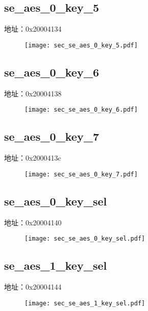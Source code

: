 \subsection{se\_aes\_0\_key\_5}
\label{sec-se-aes-0-key-5}
地址：0x20004134
 \begin{figure}[H]
\texttt{[image: sec\_se\_aes\_0\_key\_5.pdf]}
\end{figure}

\subsection{se\_aes\_0\_key\_6}
\label{sec-se-aes-0-key-6}
地址：0x20004138
 \begin{figure}[H]
\texttt{[image: sec\_se\_aes\_0\_key\_6.pdf]}
\end{figure}

\subsection{se\_aes\_0\_key\_7}
\label{sec-se-aes-0-key-7}
地址：0x2000413c
 \begin{figure}[H]
\texttt{[image: sec\_se\_aes\_0\_key\_7.pdf]}
\end{figure}

\subsection{se\_aes\_0\_key\_sel}
\label{sec-se-aes-0-key-sel}
地址：0x20004140
 \begin{figure}[H]
\texttt{[image: sec\_se\_aes\_0\_key\_sel.pdf]}
\end{figure}

\subsection{se\_aes\_1\_key\_sel}
\label{sec-se-aes-1-key-sel}
地址：0x20004144
 \begin{figure}[H]
\texttt{[image: sec\_se\_aes\_1\_key\_sel.pdf]}
\end{figure}

